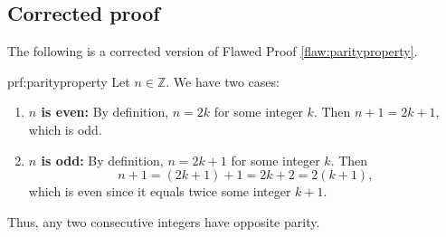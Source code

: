 \clearpage
\subsection{Corrected proof}

The following is a corrected version of Flawed Proof \ref{flaw:parityproperty}. %

\begin{prf}{prf:parityproperty} %
Let $n \in \mathbb{Z}$. We have two cases: 

\begin{enumerate}
    \item \textbf{$n$ is even:} By definition, $n = 2k$ for some integer $k$. Then $n+1 = 2k+1$, which is odd.
    \item \textbf{$n$ is odd:} By definition, $n=2k+1$ for some integer $k$. Then $$n+1 = (2k+1) +1 = 2k+2 = 2(k+1),$$
    which is even since it equals twice some integer $k+1$.
\end{enumerate}
Thus, any two consecutive integers have opposite parity.  
\end{prf}